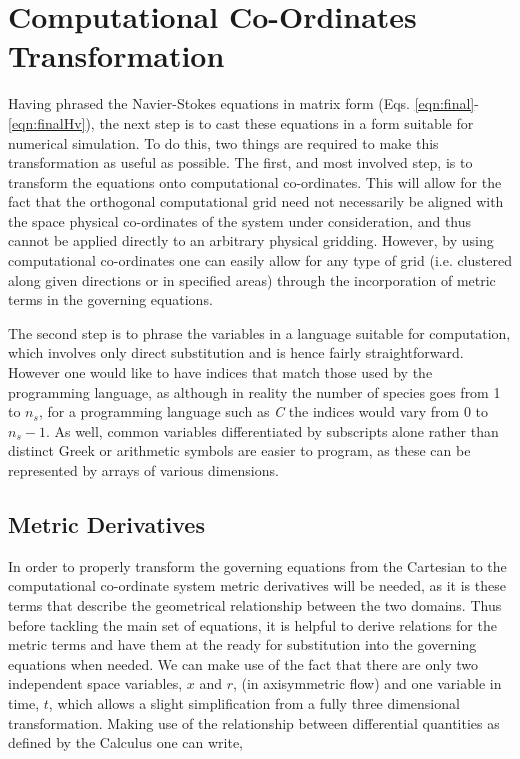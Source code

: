 \section{Computational Co-Ordinates Transformation}

	Having phrased the Navier-Stokes equations in matrix form (Eqs. \ref{eqn:final}-\ref{eqn:finalHv}), 
the next step is to cast these equations in a form suitable for numerical simulation.  To do this, two things
are required to make this transformation as useful as possible.  The first, and most involved
step, is to transform the equations onto computational co-ordinates.  This will allow 
for the fact that the orthogonal computational grid need not necessarily be aligned with the space 
physical co-ordinates  
of the system under consideration, and thus cannot be applied directly to an arbitrary physical gridding.  However,
by using computational co-ordinates one can easily allow for any type of grid (i.e.
clustered along given directions or in specified areas) through the incorporation of metric 
terms in the governing equations.

	The second step is to phrase the variables in a language suitable for computation, which
involves only direct substitution and is hence fairly straightforward.  However one would like to 
have indices that match those used by the programming language, as although in reality the number of
species goes from 1 to $n_s$, for a programming language such as \emph{C} the indices would vary 
from 0 to $n_s - 1$.  As well, common variables differentiated by subscripts alone rather than distinct
Greek or arithmetic symbols are easier to program, as these can be represented by arrays of various dimensions.


\subsection{Metric Derivatives}

	In order to properly transform the governing equations from the Cartesian to the computational
co-ordinate system metric derivatives will be needed, as it is these terms that describe the geometrical
relationship between the two domains.  Thus before tackling the main set of equations, it is helpful to 
derive relations for the metric terms and have them at the ready for substitution into the governing
equations when needed.   We can make use of the fact that there are only two independent space variables, 
$x$ and $r$, (in axisymmetric flow) and one variable in time, $t$, which allows a slight simplification from
a fully three dimensional transformation.  Making use of the relationship between differential quantities as 
defined by the Calculus one can write,

